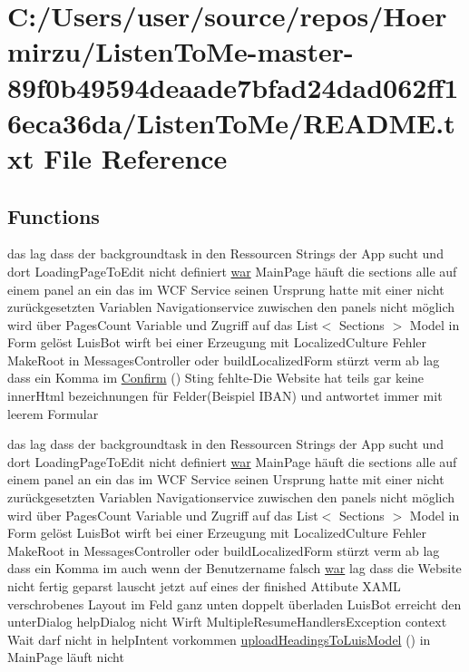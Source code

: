 \hypertarget{_r_e_a_d_m_e_8txt}{}\section{C\+:/\+Users/user/source/repos/\+Hoermirzu/\+Listen\+To\+Me-\/master-\/89f0b49594deaade7bfad24dad062ff16eca36da/\+Listen\+To\+Me/\+R\+E\+A\+D\+ME.txt File Reference}
\label{_r_e_a_d_m_e_8txt}
\subsection*{Functions}
\begin{DoxyCompactItemize}
\item 
das lag dass der backgroundtask in den Ressourcen Strings der App sucht und dort Loading\+Page\+To\+Edit nicht definiert \hyperlink{_r_e_a_d_m_e_8txt_a2a72fc7da943588cba8c302409b22e53}{war} Main\+Page häuft die sections alle auf einem panel an ein das im W\+CF Service seinen Ursprung hatte mit einer nicht zurückgesetzten Variablen Navigationservice zuwischen den panels nicht möglich wird über Pages\+Count Variable und Zugriff auf das List$<$ Sections $>$ Model in Form gelöst Luis\+Bot wirft bei einer Erzeugung mit Localized\+Culture Fehler Make\+Root in Messages\+Controller oder build\+Localized\+Form stürzt verm ab lag dass ein Komma im \hyperlink{_r_e_a_d_m_e_8txt_a3350828456fbb2a43b177e8e2a7873ed}{Confirm} () Sting fehlte-\/Die Website hat teils gar keine inner\+Html bezeichnungen für Felder(Beispiel I\+B\+AN) und antwortet immer mit leerem Formular
\item 
das lag dass der backgroundtask in den Ressourcen Strings der App sucht und dort Loading\+Page\+To\+Edit nicht definiert \hyperlink{_r_e_a_d_m_e_8txt_a2a72fc7da943588cba8c302409b22e53}{war} Main\+Page häuft die sections alle auf einem panel an ein das im W\+CF Service seinen Ursprung hatte mit einer nicht zurückgesetzten Variablen Navigationservice zuwischen den panels nicht möglich wird über Pages\+Count Variable und Zugriff auf das List$<$ Sections $>$ Model in Form gelöst Luis\+Bot wirft bei einer Erzeugung mit Localized\+Culture Fehler Make\+Root in Messages\+Controller oder build\+Localized\+Form stürzt verm ab lag dass ein Komma im auch wenn der Benutzername falsch \hyperlink{_r_e_a_d_m_e_8txt_a2a72fc7da943588cba8c302409b22e53}{war} lag dass die Website nicht fertig geparst lauscht jetzt auf eines der finished Attibute X\+A\+ML verschrobenes Layout im Feld ganz unten doppelt überladen Luis\+Bot erreicht den unter\+Dialog help\+Dialog nicht Wirft Multiple\+Resume\+Handlers\+Exception context Wait darf nicht in help\+Intent vorkommen \hyperlink{_r_e_a_d_m_e_8txt_a2aaebc81a95fa9e9802135da338a8e3e}{upload\+Headings\+To\+Luis\+Model} () in Main\+Page läuft nicht
\end{DoxyCompactItemize}

